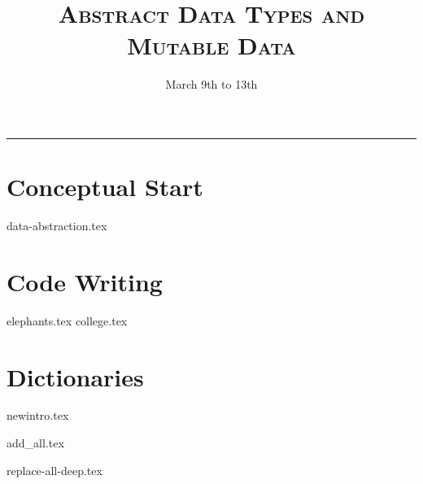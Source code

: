 \documentclass{exam}
\title{\textsc{Abstract Data Types and Mutable Data}}
\date{March 9th to 13th}
\begin{document}
\maketitle
\rule{\textwidth}{0.15em}
\fontsize{12}{15}\selectfont


\begin{questions}
\section{Conceptual Start}
{data-abstraction.tex}
\section{Code Writing}
{elephants.tex}
\newpage
{college.tex}
\newpage
\vspace{5}
\section{Dictionaries}
\vspace{5}
{newintro.tex}
\newpage
\vspace{5}

{add_all.tex}

{replace-all-deep.tex}
\end{questions}
\end{document}
